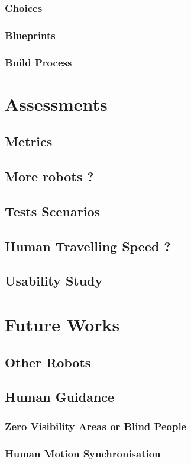\documentclass[a4paper, 12pt]{report}
\begin{document}
		\subsection{Choices}
		\subsection{Blueprints}
		\subsection{Build Process}

\chapter{Assessments}
	\section{Metrics}
	\section{More robots ?}
	\section{Tests Scenarios}
	\section{Human Travelling Speed ?}
	\section{Usability Study}

\chapter{Future Works}
	\section{Other Robots}
	\section{Human Guidance}
		\subsection{Zero Visibility Areas or Blind People}
		\subsection{Human Motion Synchronisation}
\end{document}
